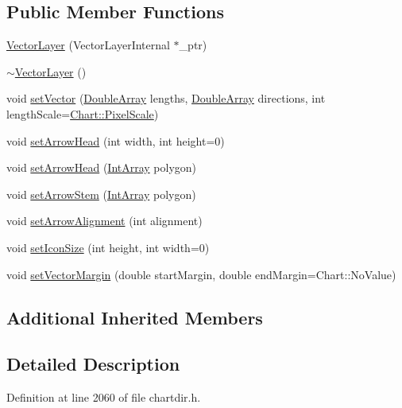 \subsection*{Public Member Functions}
\begin{DoxyCompactItemize}
\item 
\hyperlink{class_vector_layer_a4be8acefc6ee1c8969cd74367cae28f6}{Vector\+Layer} (Vector\+Layer\+Internal $\ast$\+\_\+ptr)
\item 
\hyperlink{class_vector_layer_a982d09f6de67a3e7ded1bb956adc3db5}{$\sim$\+Vector\+Layer} ()
\item 
void \hyperlink{class_vector_layer_a59c6b8884d7aafc20e92089b3e4dd6d3}{set\+Vector} (\hyperlink{class_double_array}{Double\+Array} lengths, \hyperlink{class_double_array}{Double\+Array} directions, int length\+Scale=\hyperlink{namespace_chart_af8005281e1fb57d737e9f89b13605808afebebf69a28e58958dc5f9da3ece2147}{Chart\+::\+Pixel\+Scale})
\item 
void \hyperlink{class_vector_layer_af42ed822026b94b28c4d154018eb9a1f}{set\+Arrow\+Head} (int width, int height=0)
\item 
void \hyperlink{class_vector_layer_a76baffd0a97951dadbb8a98b7ea27fbd}{set\+Arrow\+Head} (\hyperlink{class_int_array}{Int\+Array} polygon)
\item 
void \hyperlink{class_vector_layer_a776738058950abe1f23bc38c192b5553}{set\+Arrow\+Stem} (\hyperlink{class_int_array}{Int\+Array} polygon)
\item 
void \hyperlink{class_vector_layer_a9911f09f935feef10db4d5f16c6ba605}{set\+Arrow\+Alignment} (int alignment)
\item 
void \hyperlink{class_vector_layer_a8f1d79e2e95a55949b4b4b5941f44079}{set\+Icon\+Size} (int height, int width=0)
\item 
void \hyperlink{class_vector_layer_a150bc907bcb2eb5d398a908a1bd09082}{set\+Vector\+Margin} (double start\+Margin, double end\+Margin=Chart\+::\+No\+Value)
\end{DoxyCompactItemize}
\subsection*{Additional Inherited Members}


\subsection{Detailed Description}


Definition at line 2060 of file chartdir.\+h.



